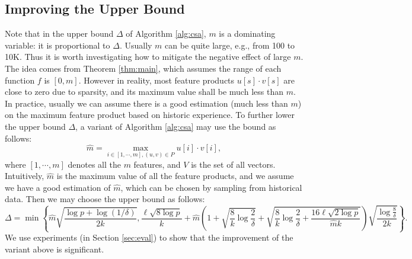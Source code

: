 \documentclass{article}
\begin{document}
\subsection{Improving the Upper Bound}
\label{sec:imprb}
Note that in the upper bound $\Delta$ of Algorithm \ref{alg:csa}, $m$ is a dominating variable: it is proportional to $\Delta$. Usually $m$ can be quite large, e.g., from 100 to 10K. Thus it is worth investigating how to mitigate the negative effect of large $m$. The idea comes from Theorem \ref{thm:main}, which assumes the range of each function $f$ is $[0,m]$. However in reality, most feature products $u[s]\cdot v[s]$ are close to zero due to sparsity, and its maximum value shall be much less than $m$. In practice, usually we can assume there is a good estimation (much less than $m$) on the maximum feature product based on historic experience. To further lower the upper bound $\Delta$, a variant of Algorithm \ref{alg:csa} may use the bound as follows:
$$\hat{m} = \max_{i\in [1,\cdots,m], (u,v) \in P}u[i]\cdot v[i],$$
where $[1,\cdots,m]$ denotes all the $m$ features, and $V$ is the set of all vectors. Intuitively, $\hat{m}$ is the maximum value of all the feature products, and we assume we have a good estimation of $\hat{m}$, which can be chosen by sampling from historical data. 
Then we may choose the upper bound as follows:
$$\Delta = \min\left\{\hat{m}\sqrt{\frac{\log p + \log(1/\delta)}{2k}}, \frac{\ell\sqrt{8\log p}}{k} +\hat{m}\left(1+\sqrt{\frac{8}{k}\log \frac{2}{\delta}} + \sqrt{\frac{8}{k}\log \frac{2}{\delta} + \frac{16\ell\sqrt{2\log p}}{\hat{m}k}}\right)\sqrt{\frac{\log \frac{8}{\delta}}{2k}}\right\}.$$
We use experiments (in Section \ref{sec:eval}) to show that the improvement of the variant above is significant. 
\end{document}

